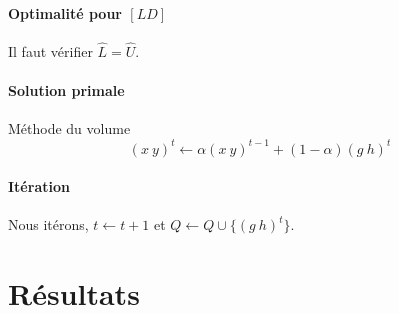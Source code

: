 \documentclass[12pt,a4paper]{article}
\begin{document}
 \paragraph{Optimalité pour $[LD]$} Il faut vérifier $\hat{L} = \hat{U}$.
 
 \paragraph{Solution primale} Méthode du volume
 $$(x~y)^t \leftarrow \alpha (x~y)^{t-1} + (1- \alpha)(g~h)^t$$
 
 \paragraph{Itération} Nous itérons, $t \leftarrow t+1$ et $Q \leftarrow Q \cup  \{(g~h)^t\}$.
 
 \section*{Résultats}
 
 
\end{document}
